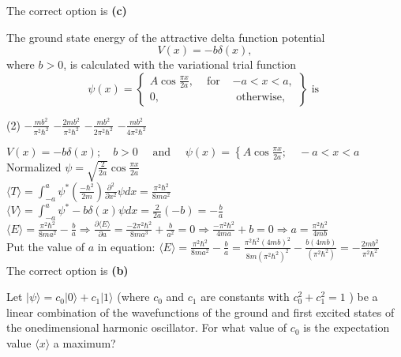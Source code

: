 \begin{enumerate}
\begin{answer}
	The correct option is \textbf{(c)}
\end{answer}
\begin{minipage}{\textwidth}
	\item The ground state energy of the attractive delta function potential
	$$
	V(x)=-b \delta(x),
	$$
	where $b>0$, is calculated with the variational trial function
	$$
	\psi(x)=\left\{\begin{array}{ccc}
	A \cos \frac{\pi x}{2 a}, & \text { for } & -a<x<a, \\
	0, & & \text { otherwise, }
	\end{array}\right\} \text { is }
	$$
\end{minipage}
\begin{tasks}(2)
	\task[\textbf{A.}] $-\frac{m b^{2}}{\pi^{2} \hbar^{2}}$
	\task[\textbf{B.}]$-\frac{2 m b^{2}}{\pi^{2} \hbar^{2}}$
	\task[\textbf{C.}]$-\frac{m b^{2}}{2 \pi^{2} \hbar^{2}}$
	\task[\textbf{D.}]$-\frac{m b^{2}}{4 \pi^{2} \hbar^{2}}$
\end{tasks}
\begin{answer}
	$V(x)=-b \delta(x) ; \quad b>0 \quad \text { and } \quad \psi(x)=\left\{A \cos \frac{\pi x}{2 a} ; \quad-a<x<a\right.$\\
	Normalized $\psi=\sqrt{\frac{2}{2 a}} \cos \frac{\pi x}{2 a}$\\
	$\langle T\rangle=\int_{-a}^{a} \psi^{*}\left(\frac{-\hbar^{2}}{2 m}\right) \frac{\partial^{2}}{\partial x^{2}} \psi d x=\frac{\pi^{2} \hbar^{2}}{8 m a^{2}}$\\
	$\langle V\rangle=\int_{-a}^{a} \psi^{*}-b \delta(x) \psi d x=\frac{2}{2 a}(-b)=-\frac{b}{a}$\\
	$\langle E\rangle=\frac{\pi^{2} \hbar^{2}}{8 m a^{2}}-\frac{b}{a} \Rightarrow \frac{\partial\langle E\rangle}{\partial a}=\frac{-2 \pi^{2} \hbar^{2}}{8 m a^{3}}+\frac{b}{a^{2}}=0 \Rightarrow \frac{-\pi^{2} \hbar^{2}}{4 m a}+b=0 \Rightarrow a=\frac{\pi^{2} \hbar^{2}}{4 m b}$\\
	Put the value of $a$ in equation: $\langle E\rangle=\frac{\pi^{2} \hbar^{2}}{8 m a^{2}}-\frac{b}{a}=\frac{\pi^{2} \hbar^{2}(4 m b)^{2}}{8 m\left(\pi^{2} \hbar^{2}\right)^{2}}-\frac{b(4 m b)}{\left(\pi^{2} \hbar^{2}\right)}=-\frac{2 m b^{2}}{\pi^{2} \hbar^{2}}$\\
	The correct option is \textbf{(b)}
\end{answer}
\begin{minipage}{\textwidth}
	\item Let $|\psi\rangle=c_{0}|0\rangle+c_{1}|1\rangle$ (where $c_{0}$ and $c_{1}$ are constants with $c_{0}^{2}+c_{1}^{2}=1$ ) be a linear combination of the wavefunctions of the ground and first excited states of the onedimensional harmonic oscillator. For what value of $c_{0}$ is the expectation value $\langle x\rangle$ a maximum?

\end{minipage}
\end{enumerate}
